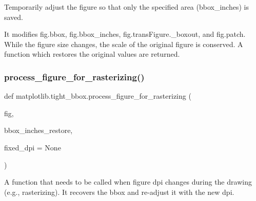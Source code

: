 \begin{DoxyVerb}Temporarily adjust the figure so that only the specified area
(bbox_inches) is saved.

It modifies fig.bbox, fig.bbox_inches,
fig.transFigure._boxout, and fig.patch.  While the figure size
changes, the scale of the original figure is conserved.  A
function which restores the original values are returned.
\end{DoxyVerb}
 \mbox{\label{namespacematplotlib_1_1tight__bbox_aa7e1c204edc0c9be0236568e0c8f9f5c}} 
\subsubsection{\texorpdfstring{process\+\_\+figure\+\_\+for\+\_\+rasterizing()}{process\_figure\_for\_rasterizing()}}
{\footnotesize\ttfamily def matplotlib.\+tight\+\_\+bbox.\+process\+\_\+figure\+\_\+for\+\_\+rasterizing (\begin{DoxyParamCaption}\item[{}]{fig,  }\item[{}]{bbox\+\_\+inches\+\_\+restore,  }\item[{}]{fixed\+\_\+dpi = {\ttfamily None} }\end{DoxyParamCaption})}

\begin{DoxyVerb}A function that needs to be called when figure dpi changes during the
drawing (e.g., rasterizing).  It recovers the bbox and re-adjust it with
the new dpi.
\end{DoxyVerb}
 